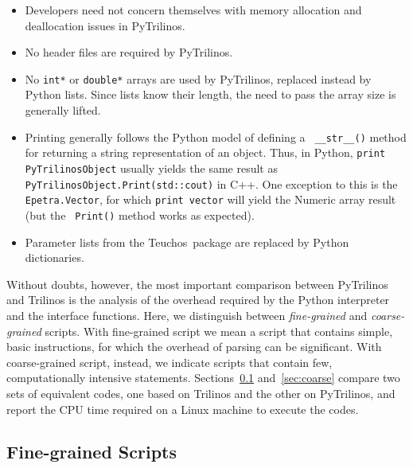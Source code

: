 \documentclass[10pt,relax]{SANDreport}
\newcommand{\PyTrilinos}{{PyTrilinos}}
\newcommand{\teuchos}{{Teuchos}}
\begin{document}
\begin{itemize}

\item Developers need not concern themselves with memory allocation
  and deallocation issues in \PyTrilinos.

\item No header files are required by \PyTrilinos.

\item No {\tt int*} or {\tt double*} arrays are used by \PyTrilinos,
  replaced instead by Python lists.  Since lists know their length,
  the need to pass the array size is generally lifted.

\item Printing generally follows the Python model of defining a {\tt
  \_\_str\_\_()} method for returning a string representation of an
  object.  Thus, in Python, {\tt print PyTrilinosObject} usually
  yields the same result as {\tt PyTrilinosObject.Print(std::cout)} in
  C++.  One exception to this is the {\tt Epetra.Vector}, for which
  {\tt print vector} will yield the Numeric array result (but the {\tt
    Print()} method works as expected).

\item Parameter lists from the \teuchos\ package are replaced by Python
  dictionaries.

\end{itemize}

Without doubts, however, the most important comparison between PyTrilinos and
Trilinos is the analysis of the overhead required by the Python interpreter
and the interface functions. Here, we distinguish between {\sl fine-grained}
and {\sl coarse-grained} scripts. With fine-grained script we mean a script
that contains simple, basic instructions, for which the overhead of parsing
can be significant. With coarse-grained script, instead, we indicate scripts
that contain few, computationally intensive statements.
Sections~\ref{sec:fine} and~\ref{sec:coarse}
compare two sets of equivalent codes, one based on Trilinos and the other on
PyTrilinos, and report the CPU time required on a Linux machine to execute the
codes.

\subsection{Fine-grained Scripts}
\label{sec:fine}
\end{document}
